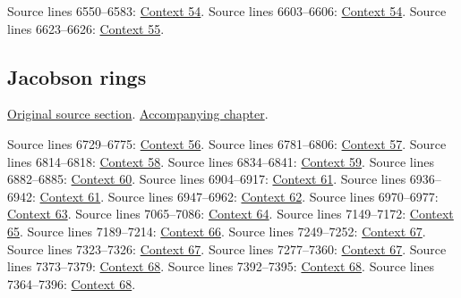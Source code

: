\begin{AlgebraSourceRoutes}
 Source lines 6550--6583: \hyperlink{algebra-context-054}{Context 54}.
 Source lines 6603--6606: \hyperlink{algebra-context-054}{Context 54}.
 Source lines 6623--6626: \hyperlink{algebra-context-055}{Context 55}.
\end{AlgebraSourceRoutes}

\subsection{Jacobson rings}
\hypertarget{algebra-source-section-ring-jacobson}{}
\noindent\href{https://github.com/stacks/stacks-project/blob/a04446e57ec1fbc252a871afcec7752fb2807b14/algebra.tex\#L6649}{Original source section}. \href{algebra.pdf\#nameddest=section-ring-jacobson}{Accompanying chapter}.

\begin{AlgebraSourceRoutes}
 Source lines 6729--6775: \hyperlink{algebra-context-056}{Context 56}.
 Source lines 6781--6806: \hyperlink{algebra-context-057}{Context 57}.
 Source lines 6814--6818: \hyperlink{algebra-context-058}{Context 58}.
 Source lines 6834--6841: \hyperlink{algebra-context-059}{Context 59}.
 Source lines 6882--6885: \hyperlink{algebra-context-060}{Context 60}.
 Source lines 6904--6917: \hyperlink{algebra-context-061}{Context 61}.
 Source lines 6936--6942: \hyperlink{algebra-context-061}{Context 61}.
 Source lines 6947--6962: \hyperlink{algebra-context-062}{Context 62}.
 Source lines 6970--6977: \hyperlink{algebra-context-063}{Context 63}.
 Source lines 7065--7086: \hyperlink{algebra-context-064}{Context 64}.
 Source lines 7149--7172: \hyperlink{algebra-context-065}{Context 65}.
 Source lines 7189--7214: \hyperlink{algebra-context-066}{Context 66}.
 Source lines 7249--7252: \hyperlink{algebra-context-067}{Context 67}.
 Source lines 7323--7326: \hyperlink{algebra-context-067}{Context 67}.
 Source lines 7277--7360: \hyperlink{algebra-context-067}{Context 67}.
 Source lines 7373--7379: \hyperlink{algebra-context-068}{Context 68}.
 Source lines 7392--7395: \hyperlink{algebra-context-068}{Context 68}.
 Source lines 7364--7396: \hyperlink{algebra-context-068}{Context 68}.
\end{AlgebraSourceRoutes}

